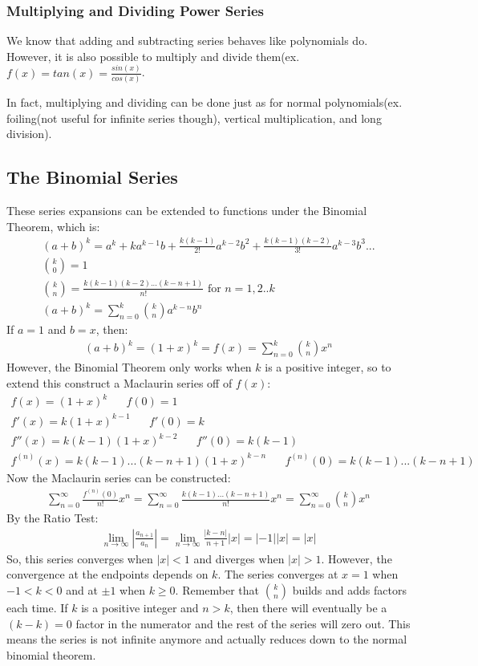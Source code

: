 \documentclass{article}
\begin{document}
\subsubsection{Multiplying and Dividing Power Series}
We know that adding and subtracting series behaves like polynomials do. However, it is also possible to multiply and divide them(ex. $f(x) = tan(x) = \frac{sin(x)}{cos(x)}$.

In fact, multiplying and dividing can be done just as for normal polynomials(ex. foiling(not useful for infinite series though), vertical multiplication, and long division).
\subsection{The Binomial Series}
These series expansions can be extended to functions under the Binomial Theorem, which is:
\begin{gather*}
    (a+b)^k = a^k + ka^{k-1}b + \frac{k(k-1)}{2!}a^{k-2}b^2 + \frac{k(k-1)(k-2)}{3!}a^{k-3}b^3...\\
    \binom{k}{0} = 1\\ \binom{k}{n} = \frac{k(k-1)(k-2)...(k-n+1)}{n!} \textrm{ for $n = 1,2..k$}\\
    (a+b)^k = \sum_{n=0}^k \binom{k}{n}a^{k-n}b^n
\end{gather*}
If $a = 1$ and $b = x$, then:
\begin{gather*}
    (a+b)^k = (1+x)^k = f(x) = \sum_{n=0}^k \binom{k}{n}x^n
\end{gather*}
However, the Binomial Theorem only works when $k$ is a positive integer, so to extend this construct a Maclaurin series off of $f(x)$:
\begin{gather*}
    f(x) = (1+x)^k\hspace{20pt}f(0) = 1\\
    f'(x) = k(1+x)^{k-1}\hspace{20pt}f'(0) = k\\
    f''(x) = k(k-1)(1+x)^{k-2}\hspace{20pt}f''(0) = k(k-1)\\
    f^{(n)}(x) = k(k-1)...(k-n+1)(1+x)^{k-n}\hspace{20pt}f^{(n)}(0) = k(k-1)...(k-n+1)
\end{gather*}
Now the Maclaurin series can be constructed:
\begin{gather*}
    \sum_{n=0}^\infty \frac{f^{(n)}(0)}{n!}x^n = \sum_{n=0}^\infty \frac{k(k-1)...(k-n+1)}{n!}x^n = \sum_{n=0}^\infty \binom{k}{n}x^n
\end{gather*}
By the Ratio Test:
\begin{gather*}
    \lim_{n \to \infty}|\frac{a_{n+1}}{a_n}| = \lim_{n \to \infty} \frac{|k-n|}{n+1}|x| = |-1||x| = |x|
\end{gather*}
So, this series converges when $|x| < 1$ and diverges when $|x| > 1$. However, the convergence at the endpoints depends on $k$. The series converges at $x = 1$ when $-1 < k < 0$ and at $\pm 1$ when $k \geqslant 0$. Remember that $\binom{k}{n}$ builds and adds factors each time. If $k$ is a positive integer and $n > k$, then there will eventually be a $(k-k) = 0$ factor in the numerator and the rest of the series will zero out. This means the series is not infinite anymore and actually reduces down to the normal binomial theorem.
\end{document}
